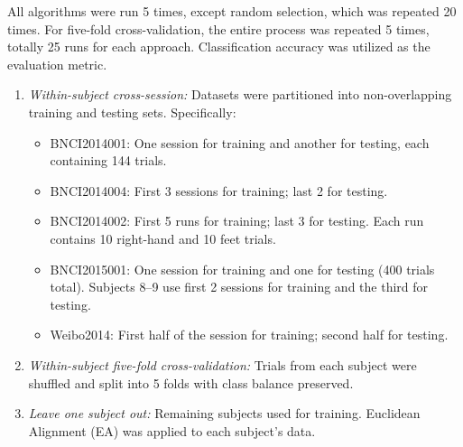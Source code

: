 \documentclass[journal,twocolumn]{IEEEtran}
\begin{document}
All algorithms were run 5 times, except random selection, which was repeated 20 times. For five-fold cross-validation, the entire process was repeated 5 times, totally 25 runs for each approach. Classification accuracy was utilized as the evaluation metric.

\begin{enumerate}
\item \emph{Within-subject cross-session:}
Datasets were partitioned into non-overlapping training and testing sets. Specifically:
  \begin{itemize}
	\item BNCI2014001: One session for training and another for testing, each containing 144 trials.
	\item BNCI2014004: First 3 sessions for training; last 2 for testing.
    \item BNCI2014002: First 5 runs for training; last 3 for testing. Each run contains 10 right-hand and 10 feet trials.
    \item BNCI2015001: One session for training and one for testing (400 trials total). Subjects 8–9 use first 2 sessions for training and the third for testing.
    \item Weibo2014: First half of the session for training; second half for testing.
  \end{itemize}
  \item \emph{Within-subject five-fold cross-validation:}
Trials from each subject were shuffled and split into 5 folds with class balance preserved.
  \item \emph{Leave one subject out:} Remaining subjects used for training. Euclidean Alignment (EA) \cite{he2019transfer} was applied to each subject's data.
\end{enumerate}
\end{document}
